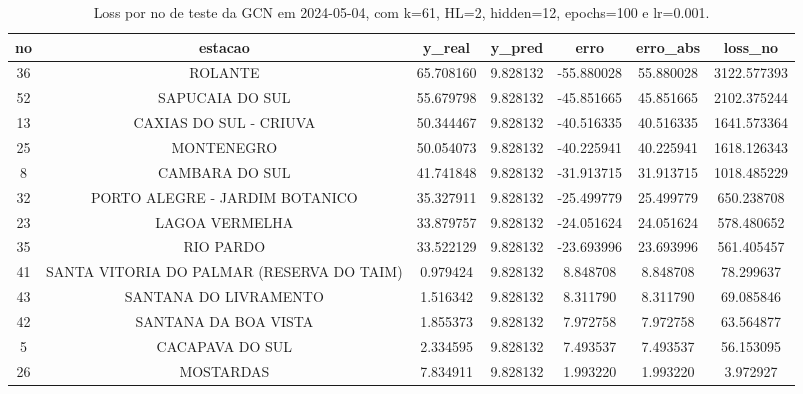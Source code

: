 \begin{table}[h]
\centering
\caption{Loss por no de teste da GCN em 2024-05-04, com k=61, HL=2, hidden=12, epochs=100 e lr=0.001.}
\label{tab:gcn_loss_k61_hl2_h12_e100_d20240504}
\begin{tabular}{ccccccc}
\toprule
no & estacao & y\_real & y\_pred & erro & erro\_abs & loss\_no \\
\midrule
36 & ROLANTE & 65.708160 & 9.828132 & -55.880028 & 55.880028 & 3122.577393 \\
52 & SAPUCAIA DO SUL & 55.679798 & 9.828132 & -45.851665 & 45.851665 & 2102.375244 \\
13 & CAXIAS DO SUL - CRIUVA & 50.344467 & 9.828132 & -40.516335 & 40.516335 & 1641.573364 \\
25 & MONTENEGRO & 50.054073 & 9.828132 & -40.225941 & 40.225941 & 1618.126343 \\
8 & CAMBARA DO SUL & 41.741848 & 9.828132 & -31.913715 & 31.913715 & 1018.485229 \\
32 & PORTO ALEGRE - JARDIM BOTANICO & 35.327911 & 9.828132 & -25.499779 & 25.499779 & 650.238708 \\
23 & LAGOA VERMELHA & 33.879757 & 9.828132 & -24.051624 & 24.051624 & 578.480652 \\
35 & RIO PARDO & 33.522129 & 9.828132 & -23.693996 & 23.693996 & 561.405457 \\
41 & SANTA VITORIA DO PALMAR (RESERVA DO TAIM) & 0.979424 & 9.828132 & 8.848708 & 8.848708 & 78.299637 \\
43 & SANTANA DO LIVRAMENTO & 1.516342 & 9.828132 & 8.311790 & 8.311790 & 69.085846 \\
42 & SANTANA DA BOA VISTA & 1.855373 & 9.828132 & 7.972758 & 7.972758 & 63.564877 \\
5 & CACAPAVA DO SUL & 2.334595 & 9.828132 & 7.493537 & 7.493537 & 56.153095 \\
26 & MOSTARDAS & 7.834911 & 9.828132 & 1.993220 & 1.993220 & 3.972927 \\
\bottomrule
\end{tabular}
\end{table}

